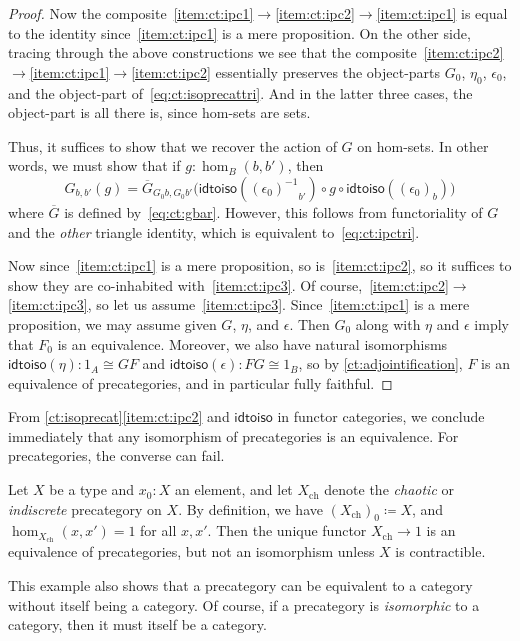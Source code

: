 \documentclass{amsart}
\newcommand{\defeq}{\coloneqq}  %
\newcommand{\opp}[1]{\mathord{{#1}^{-1}}}
\theoremstyle{definition}
\theoremstyle{remark}
\numberwithin{equation}{section}
\newcommand{\idtoiso}{\ensuremath{\mathsf{idtoiso}}\xspace}
\begin{document}
\begin{proof}
  Now the composite~\ref{item:ct:ipc1}$\to$\ref{item:ct:ipc2}$\to$\ref{item:ct:ipc1} is equal to the identity since~\ref{item:ct:ipc1} is a mere proposition.
  On the other side, tracing through the above constructions we see that the composite~\ref{item:ct:ipc2}$\to$\ref{item:ct:ipc1}$\to$\ref{item:ct:ipc2} essentially preserves the object-parts $G_0$, $\eta_0$, $\epsilon_0$, and the object-part of~\eqref{eq:ct:isoprecattri}.
  And in the latter three cases, the object-part is all there is, since hom-sets are sets.

  Thus, it suffices to show that we recover the action of $G$ on hom-sets.
  In other words, we must show that if $g:\hom_B(b,b')$, then
  \[ G_{b,b'}(g) =
  \overline{G}_{G_0b,G_0b'}\Big(\idtoiso(\opp{(\epsilon_0)}_{b'}) \circ g \circ \idtoiso((\epsilon_0)_b)\Big)
  \]
  where $\overline{G}$ is defined by~\eqref{eq:ct:gbar}.
  However, this follows from functoriality of $G$ and the \emph{other} triangle identity, which is equivalent to~\eqref{eq:ct:ipctri}.

  Now since~\ref{item:ct:ipc1} is a mere proposition, so is~\ref{item:ct:ipc2}, so it suffices to show they are co-inhabited with~\ref{item:ct:ipc3}.
  Of course,~\ref{item:ct:ipc2}$\to$\ref{item:ct:ipc3}, so let us assume~\ref{item:ct:ipc3}.
  Since~\ref{item:ct:ipc1} is a mere proposition, we may assume given $G$, $\eta$, and $\epsilon$.
  Then $G_0$ along with $\eta$ and $\epsilon$ imply that $F_0$ is an equivalence.
  Moreover, we also have natural isomorphisms $\idtoiso(\eta):1_A\cong GF$ and $\idtoiso(\epsilon):FG\cong 1_B$, so by \autoref{ct:adjointification}, $F$ is an equivalence of precategories, and in particular fully faithful.
\end{proof}

From \autoref{ct:isoprecat}\ref{item:ct:ipc2} and $\idtoiso$ in functor categories, we conclude immediately that any isomorphism of precategories is an equivalence.
For precategories, the converse can fail.

\begin{eg}\label{ct:chaotic}
  Let $X$ be a type and $x_0:X$ an element, and let $X_{\mathrm{ch}}$ denote the \emph{chaotic} or \emph{indiscrete} precategory on $X$.
  By definition, we have $(X_{\mathrm{ch}})_0\defeq X$, and $\hom_{X_{\mathrm{ch}}}(x,x') = 1$ for all $x,x'$.
  Then the unique functor $X_{\mathrm{ch}}\to 1$ is an equivalence of precategories, but not an isomorphism unless $X$ is contractible.

  This example also shows that a precategory can be equivalent to a category without itself being a category.
  Of course, if a precategory is \emph{isomorphic} to a category, then it must itself be a category.
\end{eg}
\end{document}
